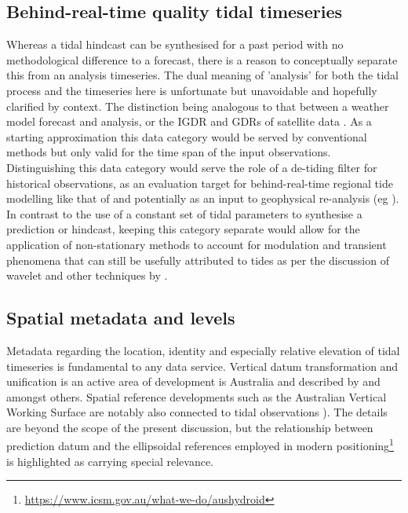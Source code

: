 \subsection{Behind-real-time quality tidal timeseries}  
\label{Sec:flavour3} 
Whereas a tidal hindcast can be synthesised for a past period with no methodological difference to a forecast, there is a reason to conceptually separate this from an analysis timeseries. The dual meaning of 'analysis' for both the tidal process and the timeseries here is unfortunate but unavoidable and hopefully clarified by context. 
The distinction being analogous to that between a weather model forecast and analysis, or the IGDR and GDRs of satellite data \cite{Picot:2003tp}.    As a starting approximation this data category would be served by conventional methods but only valid for the time span of the input observations. 
Distinguishing this data category would serve the role of a de-tiding filter for historical observations, as an evaluation target for behind-real-time regional tide modelling like that of \citeauthor{10.5194/os-2020-107} and potentially as an input to geophysical re-analysis (eg \cite{10.1029/2017jc013685}).    
In contrast to the use of a constant set of tidal parameters to synthesise a prediction or hindcast, keeping this category separate would allow for the application of non-stationary methods to account for modulation and transient phenomena that can still be usefully attributed to tides as per the discussion of wavelet and other techniques by \citeauthor{Flinchem:2000kp}. 

\subsection{Spatial metadata and levels}
\label{sec:spatial}
Metadata regarding the location, identity and especially relative elevation of tidal timeseries is fundamental to any data service.
Vertical datum transformation and unification is an active area of development is Australia and described by  \citeauthor{Keysers:we} and \citeauthor{Filmer:2018cu} amongst others.   Spatial reference developments such as the Australian Vertical Working Surface are notably also connected to tidal observations \cite{AVWS2021}).   The details are beyond the scope of the present discussion, but the relationship between prediction datum and the ellipsoidal references employed in modern positioning\footnote{\url{ https://www.icsm.gov.au/what-we-do/aushydroid}} is highlighted as carrying special relevance.

